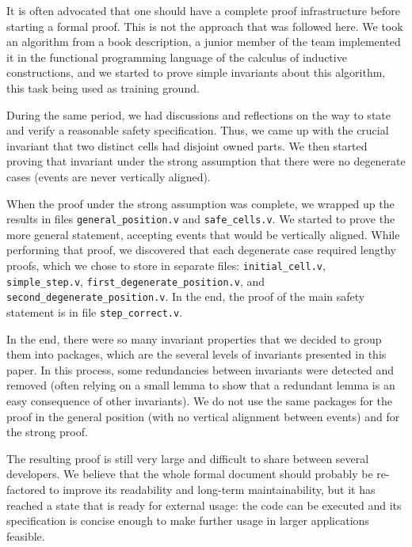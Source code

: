 \documentclass[a4paper, USenglish, cleveref, autoref, thm-restate, final]{lipics-v2021}
\begin{document}
It is often advocated that one should have a complete proof
infrastructure before starting a formal proof.  This is not the
approach that was followed here.  We took an algorithm from a book
description, a junior member of the team implemented it in the
functional programming language of the calculus of inductive
constructions, and we started to prove simple invariants about this
algorithm, this task being used as training ground.

During the same period, we had discussions and reflections on the way to
state and verify a reasonable safety specification.  Thus, we came up with the
crucial invariant that two distinct cells had disjoint owned parts.  We then
started proving that invariant under the strong assumption that there
were no degenerate cases (events are never vertically aligned).

When the proof under the strong assumption was complete, we wrapped up the
results in files {\tt general\_position.v} and {\tt safe\_cells.v}.
We started to prove the more general statement, accepting events that
would be vertically
aligned.  While performing that proof, we discovered that each degenerate
case required lengthy proofs, which we chose to store in separate files:
{\tt initial\_cell.v}, {\tt simple\_step.v},
{\tt first\_degenerate\_position.v}, and
{\tt second\_degenerate\_position.v}.  In the end, the proof of the main
safety statement is in file {\tt step\_correct.v}.

In the end, there were so many invariant properties that we decided to group
them into packages, which are the several levels of invariants presented
in this paper.  In this process, some redundancies between invariants were
detected and removed (often relying on a small lemma to show that a redundant
lemma is an easy consequence of other invariants).  We do not use the same
packages for the proof in the general position (with no vertical alignment
between events) and for the strong proof.

The resulting proof is still very large and difficult to share between several
developers.  We believe that the whole formal document should probably be
re-factored to improve its readability and long-term maintainability, but it
has reached a state that is ready for external usage: the code can be executed
and its specification is concise enough to make further usage in larger
applications feasible.
\end{document}
